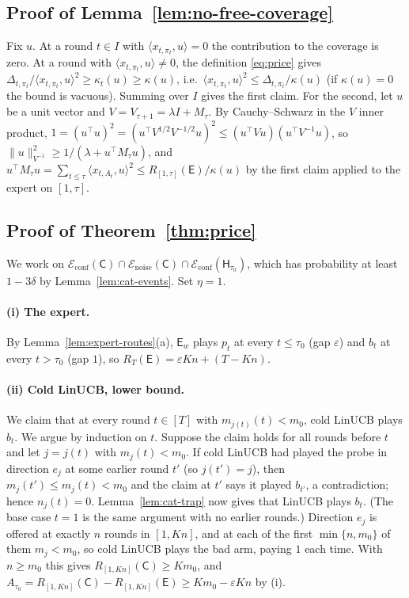 \documentclass[anon]{alt2027} %
\providecommand{\qed}{\hfill\jmlrBlackBox}
\newcommand{\eps}{\varepsilon}
\newcommand{\Cold}{\mathsf{C}}
\newcommand{\Exp}{\mathsf{E}}
\newcommand{\Hyb}{\mathsf{H}}
\begin{document}
\subsection{Proof of Lemma~\ref{lem:no-free-coverage}}

Fix $u$. At a round $t\in I$ with $\langle x_{t,\pi_t},u\rangle=0$ the
contribution to the coverage is zero. At a round with
$\langle x_{t,\pi_t},u\rangle\ne0$, the definition \eqref{eq:price} gives
$\Delta_{t,\pi_t}/\langle x_{t,\pi_t},u\rangle^2\ge\kappa_t(u)\ge\kappa(u)$, i.e.\
$\langle x_{t,\pi_t},u\rangle^2\le\Delta_{t,\pi_t}/\kappa(u)$ (if $\kappa(u)=0$ the bound
is vacuous). Summing over $I$ gives the first claim. For the second, let
$u$ be a unit vector and $V=V_{\tau+1}=\lambda I+M_\tau$. By Cauchy--Schwarz in
the $V$ inner product,
$1=(u^\top u)^2=(u^\top V^{1/2}V^{-1/2}u)^2\le(u^\top Vu)(u^\top V^{-1}u)$, so
$\|u\|^2_{V^{-1}}\ge1/(\lambda+u^\top M_\tau u)$, and
$u^\top M_\tau u=\sum_{t\le\tau}\langle x_{t,A_t},u\rangle^2\le R_{[1,\tau]}(\Exp)/\kappa(u)$
by the first claim applied to the expert on $[1,\tau]$. \qed

\subsection{Proof of Theorem~\ref{thm:price}}

We work on $\mathcal E_{\mathrm{conf}}(\Cold)\cap\mathcal E_{\mathrm{noise}}(\Cold)\cap\mathcal E_{\mathrm{conf}}(\Hyb_{\tau_0})$,
which has probability at least $1-3\delta$ by Lemma~\ref{lem:cat-events}. Set
$\eta=1$.

\paragraph{(i) The expert.}
By Lemma~\ref{lem:expert-routes}(a), $\Exp_w$ plays $p_t$ at every $t\le\tau_0$
(gap $\eps$) and $b_t$ at every $t>\tau_0$ (gap $1$), so $R_T(\Exp)=\eps Kn+(T-Kn)$.

\paragraph{(ii) Cold LinUCB, lower bound.}
We claim that at every round $t\in[T]$ with $m_{j(t)}(t)<m_0$, cold LinUCB
plays $b_t$. We argue by induction on $t$. Suppose the claim holds for all
rounds before $t$ and let $j=j(t)$ with $m_j(t)<m_0$. If cold LinUCB had
played the probe in direction $e_j$ at some earlier round $t'$ (so $j(t')=j$),
then $m_j(t')\le m_j(t)<m_0$ and the claim at $t'$ says it played $b_{t'}$,
a contradiction; hence $n_j(t)=0$. Lemma~\ref{lem:cat-trap} now gives that
LinUCB plays $b_t$. (The base case $t=1$ is the same argument with no earlier
rounds.) Direction $e_j$ is offered at exactly $n$ rounds in $[1,Kn]$, and at
each of the first $\min\{n,m_0\}$ of them $m_j<m_0$, so cold LinUCB plays the
bad arm, paying $1$ each time. With $n\ge m_0$ this gives $R_{[1,Kn]}(\Cold)\ge Km_0$,
and $A_{\tau_0}=R_{[1,Kn]}(\Cold)-R_{[1,Kn]}(\Exp)\ge Km_0-\eps Kn$ by (i).
\end{document}
